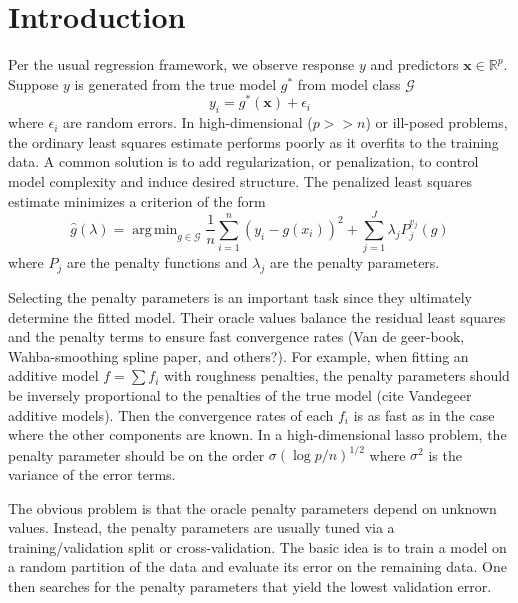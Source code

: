 \documentclass[12pt]{article}
\DeclareMathOperator*{\argmin}{arg\,min}
\begin{document}
\newpage
{} %
\section{Introduction}

Per the usual regression framework, we observe response $y$ and predictors $\boldsymbol {x} \in \mathbb{R}^p$. Suppose $y$ is generated from the true model $g^*$ from model class $\mathcal{G}$
\begin{equation}
y_i = g^*(\boldsymbol x) + \epsilon_i
\end{equation}
where $\epsilon_i$ are random errors. In high-dimensional ($p >> n$) or ill-posed problems, the ordinary least squares estimate performs poorly as it overfits to the training data. A common solution is to add regularization, or penalization, to control model complexity and induce desired structure. The penalized least squares estimate minimizes a criterion of the form
\begin{equation}
\label{orig_train_criterion}
\hat{g}(\lambda) = \argmin_{g\in \mathcal{G}} \frac{1}{n} \sum_{i=1}^n \left (y_i -  g(x_i) \right )^2 + \sum_{j=1}^J \lambda_j P^{v_j}_j(g)
\end{equation}
where $P_j$ are the penalty functions and $\lambda_j$ are the penalty parameters.

Selecting the penalty parameters is an important task since they ultimately determine the fitted model. Their oracle values balance the residual least squares and the penalty terms to ensure fast convergence rates (Van de geer-book, Wahba-smoothing spline paper, and others?). For example, when fitting an additive model $f = \sum f_i$ with roughness penalties, the penalty parameters should be inversely proportional to the penalties of the true model (cite Vandegeer additive models). Then the convergence rates of each $f_i$ is as fast as in the case where the other components are known. In a high-dimensional lasso problem, the penalty parameter should be on the order $\sigma (\log p /n )^{1/2}$ where $\sigma^2$ is the variance of the error terms.

The obvious problem is that the oracle penalty parameters depend on unknown values. Instead, the penalty parameters are usually tuned via a training/validation split or cross-validation. The basic idea is to train a model on a random partition of the data and evaluate its error on the remaining data. One then searches for the penalty parameters that yield the lowest validation error.
\end{document}
